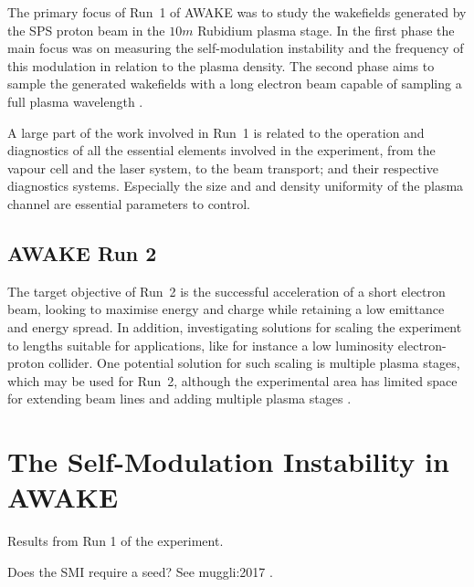 The primary focus of Run~1 of AWAKE was to study the wakefields generated by the SPS proton beam in the $10\unit{m}$ Rubidium plasma stage.
In the first phase the main focus was on measuring the self-modulation instability and the frequency of this modulation in relation to the plasma density.
The second phase aims to sample the generated wakefields with a long electron beam capable of sampling a full plasma wavelength \cite{adli:2016a}.

A large part of the work involved in Run~1 is related to the operation and diagnostics of all the essential elements involved in the experiment, from the vapour cell and the laser system, to the beam transport; and their respective diagnostics systems.
Especially the size and and density uniformity of the plasma channel are essential parameters to control.

\subsection{AWAKE Run 2}
\label{WFA:AWAKE:R2}

The target objective of Run~2 is the successful acceleration of a short electron beam, looking to maximise energy and charge while retaining a low emittance and energy spread.
In addition, investigating solutions for scaling the experiment to lengths suitable for applications, like for instance a low luminosity electron-proton collider.
One potential solution for such scaling is multiple plasma stages, which may be used for Run~2, although the experimental area has limited space for extending beam lines and adding multiple plasma stages \cite{adli:2016a}.

\section{The Self-Modulation Instability in AWAKE}
\label{WFA:SMI}

Results from Run 1 of the experiment.


Does the SMI require a seed? See muggli:2017 \cite{muggli:2017a}.


